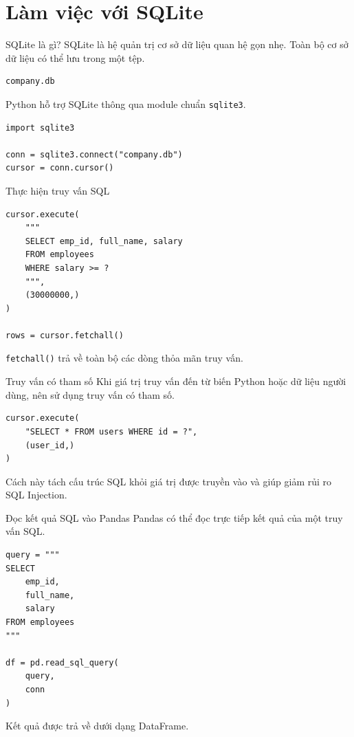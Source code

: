 \documentclass[aspectratio=169,11pt]{beamer}
\newcommand{\code}[1]{\texttt{#1}}
\begin{document}
\section{Làm việc với SQLite}

\begin{frame}[fragile]{SQLite là gì?}
SQLite là hệ quản trị cơ sở dữ liệu quan hệ gọn nhẹ. Toàn bộ cơ sở dữ liệu có thể lưu trong một tệp.

\begin{lstlisting}[style=textstyle]
company.db
\end{lstlisting}

Python hỗ trợ SQLite thông qua module chuẩn \code{sqlite3}.
\begin{lstlisting}[style=pythonstyle]
import sqlite3

conn = sqlite3.connect("company.db")
cursor = conn.cursor()
\end{lstlisting}
\end{frame}

\begin{frame}[fragile]{Thực hiện truy vấn SQL}
\begin{lstlisting}[style=pythonstyle]
cursor.execute(
    """
    SELECT emp_id, full_name, salary
    FROM employees
    WHERE salary >= ?
    """,
    (30000000,)
)

rows = cursor.fetchall()
\end{lstlisting}

\code{fetchall()} trả về toàn bộ các dòng thỏa mãn truy vấn.
\end{frame}

\begin{frame}[fragile]{Truy vấn có tham số}
Khi giá trị truy vấn đến từ biến Python hoặc dữ liệu người dùng, nên sử dụng truy vấn có tham số.

\begin{lstlisting}[style=pythonstyle]
cursor.execute(
    "SELECT * FROM users WHERE id = ?",
    (user_id,)
)
\end{lstlisting}

Cách này tách cấu trúc SQL khỏi giá trị được truyền vào và giúp giảm rủi ro SQL Injection.
\end{frame}

\begin{frame}[fragile]{Đọc kết quả SQL vào Pandas}
Pandas có thể đọc trực tiếp kết quả của một truy vấn SQL.

\begin{lstlisting}[style=pythonstyle]
query = """
SELECT
    emp_id,
    full_name,
    salary
FROM employees
"""

df = pd.read_sql_query(
    query,
    conn
)
\end{lstlisting}

Kết quả được trả về dưới dạng DataFrame.
\end{frame}
\end{document}

